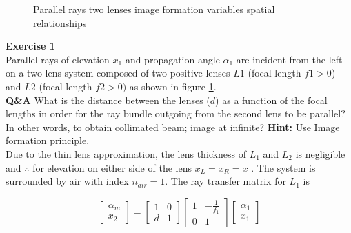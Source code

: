 \documentclass[main.tex]{subfiles}
\begin{document}
\begin{figure}
\centering{}
\caption{Parallel rays two lenses image formation variables spatial relationships}
\label{fig:2_1}
\end{figure}

\textbf{Exercise 1}\\
Parallel rays of elevation $x_1$ and propagation angle $\alpha_1$ are incident from the left on a two-lens system composed of two positive lenses $L1$ (focal length $f1>0$) and $L2$ (focal length $f2 >0)$ as shown in figure \ref{fig:2_1}.\\

\textbf{Q\&A} What is the distance between the lenses ($d$) as a function of the focal lengths in order for the ray bundle outgoing from the second lens to be parallel? In other words, to obtain collimated beam; image at infinite? \textbf{Hint:} Use Image formation principle.\\


Due to the thin lens approximation, the lens thickness of $L_1$ and $L_2$ is negligible and $\therefore$ for elevation on either side of the lens $x_L = x_R = x$ . The system is surrounded by air with index $n_{air} = 1$. The ray transfer matrix for $L_1$ is

\begin{equation}
\begin{bmatrix}
    \alpha_m \\
    x_2
\end{bmatrix}
=
\begin{bmatrix}
    1   &   0 \\
    d   &   1
\end{bmatrix}
\begin{bmatrix}
    1   & -\frac{1}{f_1} \\
    0   &   1
\end{bmatrix}
\begin{bmatrix}
     \alpha_{1} \\
    x_1
\end{bmatrix}
\end{equation}
\end{document}
